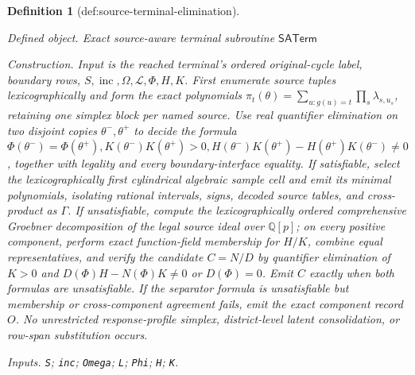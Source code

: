 \documentclass{article}
\newtheorem{definition}{Definition}
\begin{document}
\begin{definition}[def:source-terminal-elimination]\label{def:source-terminal-elimination}
\par\smallskip\noindent\emph{Defined object.} Exact source-aware terminal subroutine \(\mathsf{SATerm}\)
\par\smallskip\noindent\emph{Construction.} Input is the reached terminal's ordered original-cycle label, boundary rows, \(S,\operatorname{inc},\Omega,\mathcal L,\Phi,H,K\). First enumerate source tuples lexicographically and form the exact polynomials \(\pi_t(\theta)=\sum_{u:g(u)=t}\prod_s\lambda_{s,u_s}\), retaining one simplex block per named source. Use real quantifier elimination on two disjoint copies \(\theta^-,\theta^+\) to decide the formula \(\Phi(\theta^-)=\Phi(\theta^+), K(\theta^-)K(\theta^+)>0, H(\theta^-)K(\theta^+)-H(\theta^+)K(\theta^-)\ne0\), together with legality and every boundary-interface equality. If satisfiable, select the lexicographically first cylindrical algebraic sample cell and emit its minimal polynomials, isolating rational intervals, signs, decoded source tables, and cross-product as \(\Gamma\). If unsatisfiable, compute the lexicographically ordered comprehensive Groebner decomposition of the legal source ideal over \(\mathbb Q[p]\); on every positive component, perform exact function-field membership for \(H/K\), combine equal representatives, and verify the candidate \(C=N/D\) by quantifier elimination of \(K>0\) and \(D(\Phi)H-N(\Phi)K\ne0\) or \(D(\Phi)=0\). Emit \(C\) exactly when both formulas are unsatisfiable. If the separator formula is unsatisfiable but membership or cross-component agreement fails, emit the exact component record \(O\). No unrestricted response-profile simplex, district-level latent consolidation, or row-span substitution occurs.
\par\smallskip\noindent\emph{Inputs.} \texttt{S}; \texttt{inc}; \texttt{Omega}; \texttt{L}; \texttt{Phi}; \texttt{H}; \texttt{K}.
\end{definition}
\end{document}
